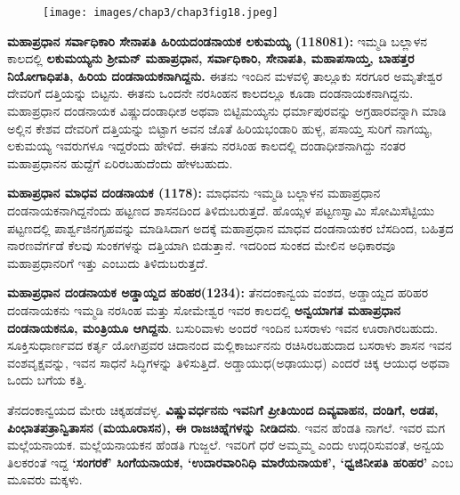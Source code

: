 \begin{figure}[!h]
\texttt{[image: images/chap3/chap3fig18.jpeg]}
\end{figure}

\textbf{ಮಹಾಪ್ರಧಾನ ಸರ್ವಾಧಿಕಾರಿ ಸೇನಾಪತಿ ಹಿರಿಯದಂಡನಾಯಕ ಲಕುಮಯ್ಯ (1180\general{\enginline{-}}81):} ಇಮ್ಮಡಿ ಬಲ್ಲಾಳನ ಕಾಲದಲ್ಲಿ \textbf{ಲಕುಮಯ್ಯನು ಶ‍್ರೀಮನ್​ ಮಹಾಪ್ರಧಾನ, ಸರ್ವಾಧಿಕಾರಿ, ಸೇನಾಪತಿ, ಮಹಾಪಸಾಯ್ತ, ಬಾಹತ್ತರ ನಿಯೋಗಾಧಿಪತಿ, ಹಿರಿಯ ದಂಡನಾಯಕನಾಗಿದ್ದನು.} ಈತನು ಇಂದಿನ ಮಳವಳ್ಳಿ ತಾಲ್ಲೂಕು ಸರಗೂರ ಅಮೃತೇಶ್ವರ ದೇವರಿಗೆ ದತ್ತಿಯನ್ನು ಬಿಟ್ಟನು. ಈತನು ಒಂದನೇ ನರಸಿಂಹನ ಕಾಲದಲ್ಲೂ ಕೂಡಾ ದಂಡನಾಯಕನಾಗಿದ್ದನು. ಮಹಾಪ್ರಧಾನ ದಂಡನಾಯಕ ವಿಷ್ಣುದಂಡಾಧೀಶ ಅಥವಾ ಬಿಟ್ಟಿಮಯ್ಯನು ಧರ್ಮಾಪುರವನ್ನು ಅಗ್ರಹಾರವನ್ನಾಗಿ ಮಾಡಿ ಅಲ್ಲಿನ ಕೇಶವ ದೇವರಿಗೆ ದತ್ತಿಯನ್ನು ಬಿಟ್ಟಾಗ ಅವನ ಜೊತೆ ಹಿರಿಯಭಂಡಾರಿ ಹುಳ್ಳ, ಪಸಾಯ್ತ ಸುರಿಗೆ ನಾಗಯ್ಯ, ಲಕುಮಯ್ಯ ಇವರುಗಳೂ ಇದ್ದರೆಂದು ಹೇಳಿದೆ. ಈತನು ನರಸಿಂಹ ಕಾಲದಲ್ಲಿ ದಂಡಾಧೀಶನಾಗಿದ್ದು ನಂತರ ಮಹಾಪ್ರಧಾನನ ಹುದ್ದೆಗೆ ಏರಿರಬಹುದೆಂದು ಹೇಳಬಹುದು.

\textbf{ಮಹಾಪ್ರಧಾನ ಮಾಧವ ದಂಡನಾಯಕ (1178): }ಮಾಧವನು ಇಮ್ಮಡಿ ಬಲ್ಲಾಳನ ಮಹಾಪ್ರಧಾನ ದಂಡನಾಯಕ\-ನಾಗಿದ್ದನೆಂದು ಹಟ್ಟಣದ ಶಾಸನದಿಂದ ತಿಳಿದುಬರುತ್ತದೆ. ಹೊಯ್ಸಳ ಪಟ್ಟಣಸ್ವಾಮಿ ಸೋಮಿಸೆಟ್ಟಿಯು ಪಟ್ಟಣದಲ್ಲಿ ಪಾರ್ಶ್ವಜಿನಗೃಹವನ್ನು ಮಾಡಿಸಿದಾಗ ಅದಕ್ಕೆ ಮಹಾಪ್ರಧಾನ ಮಾಧವ ದಂಡನಾಯಕರ ಬೆಸದಿಂದ, ಬಹಿತ್ರದ ನಾರಣವೆರ್ಗಡೆ ಕೆಲವು ಸುಂಕಗಳನ್ನು ದತ್ತಿಯಾಗಿ ಬಿಡುತ್ತಾನೆ. ಇದರಿಂದ ಸುಂಕದ ಮೇಲಿನ ಅಧಿಕಾರವೂ ಮಹಾಪ್ರಧಾನರಿಗೆ ಇತ್ತು ಎಂಬುದು ತಿಳಿದುಬರುತ್ತದೆ.

\textbf{ಮಹಾಪ್ರಧಾನ ದಂಡನಾಯಕ ಅಡ್ಡಾಯ್ದದ ಹರಿಹರ(1234):} ತೆನದಂಕಾನ್ವಯ ವಂಶದ, ಅಡ್ಡಾಯ್ದದ ಹರಿಹರ ದಂಡನಾಯಕನು ಇಮ್ಮಡಿ ನರಸಿಂಹ ಮತ್ತು ಸೋಮೇಶ್ವರ ಇವರ ಕಾಲದಲ್ಲಿ \textbf{ಅನ್ವಯಾಗತ ಮಹಾಪ್ರಧಾನ ದಂಡನಾಯಕನೂ, ಮಂತ್ರಿಯೂ ಆಗಿದ್ದನು}. ಬಸುರಿವಾಳು ಅಂದರೆ ಇಂದಿನ ಬಸರಾಳು ಇವನ ಊರಾಗಿರಬಹುದು. ಸೂಕ್ತಿಸುಧಾರ್ಣವದ ಕರ್ತೃ ಯೋಗಿಪ್ರವರ ಚಿದಾನಂದ ಮಲ್ಲಿಕಾರ್ಜುನನು ರಚಿಸಿರಬಹುದಾದ ಬಸರಾಳು ಶಾಸನ ಇವನ ವಂಶವೃಕ್ಷವನ್ನು, ಇವನ ಸಾಧನೆ ಸಿದ್ಧಿಗಳನ್ನು ತಿಳಿಸುತ್ತಿದೆ. ಅಡ್ಡಾಯುಧ(ಅಢಾಯುಧ) ಎಂದರೆ ಚಿಕ್ಕ ಆಯುಧ ಅಥವಾ ಒಂದು ಬಗೆಯ ಕತ್ತಿ.

ತೆನದಂಕಾನ್ವಯದ ಮೇರು ಚಿಕ್ಕಹಡೆವಳ್ಳ. \textbf{ವಿಷ್ಣುವರ್ಧನನು ಇವನಿಗೆ ಪ್ರೀತಿಯಿಂದ ದಿವ್ಯವಾಹನ, ದಂಡಿಗೆ, ಅಡಪ, ಪಿಂಛಾತಪತ್ರಾನ್ವಿತಾಸನ (ಮಯೂರಾಸನ), ಈ ರಾಜಚಿಹ್ನೆಗಳನ್ನು ನೀಡಿದನು}. ಇವನ ಹೆಂಡತಿ ನಾಗಲೆ. ಇವರ ಮಗ ಮಲ್ಲೆಯನಾಯಕ. ಮಲ್ಲೆಯನಾಯಕನ ಹೆಂಡತಿ ಗುಜ್ಜಲೆ. ಇವರಿಗೆ ಧರೆ ಅಮ್ಮಮ್ಮ ಎಂದು ಉದ್ಗರಿಸುವಂತೆ, ಅನ್ವಯ ತಿಲಕರಂತೆ ಇದ್ದ \textbf{‘ಸಂಗರಕೆ’ ಸಿಂಗೆಯನಾಯಕ, ‘ಉದಾರವಾರಿನಿಧಿ ಮಾರೆಯನಾಯಕ’, ‘ಧ್ವಜಿನೀಪತಿ ಹರಿಹರ’} ಎಂಬ ಮೂವರು ಮಕ್ಕಳು.

